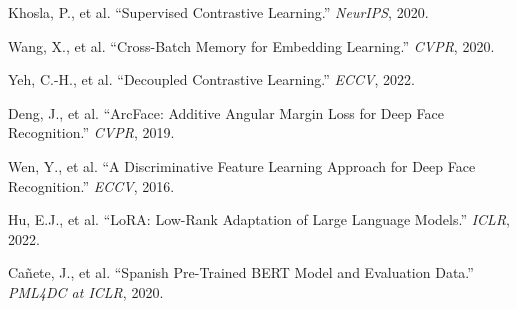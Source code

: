 \documentclass[11pt,a4paper]{article}
\begin{document}
\begin{enumerate}[label={[\arabic*]}]
\item Khosla, P., et al. ``Supervised Contrastive Learning.''
\textit{NeurIPS}, 2020.

\item Wang, X., et al. ``Cross-Batch Memory for Embedding Learning.''
\textit{CVPR}, 2020.

\item Yeh, C.-H., et al. ``Decoupled Contrastive Learning.''
\textit{ECCV}, 2022.

\item Deng, J., et al. ``ArcFace: Additive Angular Margin Loss for Deep
Face Recognition.'' \textit{CVPR}, 2019.

\item Wen, Y., et al. ``A Discriminative Feature Learning Approach for
Deep Face Recognition.'' \textit{ECCV}, 2016.

\item Hu, E.J., et al. ``LoRA: Low-Rank Adaptation of Large Language
Models.'' \textit{ICLR}, 2022.

\item Ca\~{n}ete, J., et al. ``Spanish Pre-Trained BERT Model and
Evaluation Data.'' \textit{PML4DC at ICLR}, 2020.
\end{enumerate}
\end{document}
